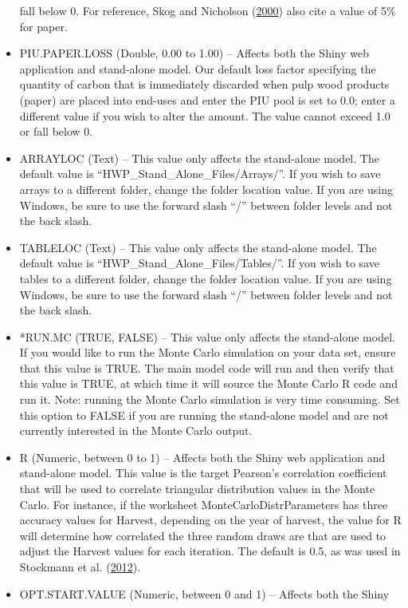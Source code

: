 \documentclass[
  openany]{book}
\begin{document}
\begin{itemize}
  fall below 0. For reference, Skog and Nicholson
  (\protect\hyperlink{ref-skog2000}{2000}) also cite a value of 5\% for
  paper.
\item
  PIU.PAPER.LOSS (Double, 0.00 to 1.00) -- Affects both the Shiny web
  application and stand-alone model. Our default loss factor specifying
  the quantity of carbon that is immediately discarded when pulp wood
  products (paper) are placed into end-uses and enter the PIU pool is
  set to 0.0; enter a different value if you wish to alter the amount.
  The value cannot exceed 1.0 or fall below 0.
\item
  ARRAYLOC (Text) -- This value only affects the stand-alone model. The
  default value is ``HWP\_Stand\_Alone\_Files/Arrays/''. If you wish to
  save arrays to a different folder, change the folder location value.
  If you are using Windows, be sure to use the forward slash ``/''
  between folder levels and not the back slash.
\item
  TABLELOC (Text) -- This value only affects the stand-alone model. The
  default value is ``HWP\_Stand\_Alone\_Files/Tables/''. If you wish to
  save tables to a different folder, change the folder location value.
  If you are using Windows, be sure to use the forward slash ``/''
  between folder levels and not the back slash.
\item
  *RUN.MC (TRUE, FALSE) -- This value only affects the stand-alone
  model. If you would like to run the Monte Carlo simulation on your
  data set, ensure that this value is TRUE. The main model code will run
  and then verify that this value is TRUE, at which time it will source
  the Monte Carlo R code and run it. Note: running the Monte Carlo
  simulation is very time consuming. Set this option to FALSE if you are
  running the stand-alone model and are not currently interested in the
  Monte Carlo output.
\item
  R (Numeric, between 0 to 1) -- Affects both the Shiny web application
  and stand-alone model. This value is the target Pearson's correlation
  coefficient that will be used to correlate triangular distribution
  values in the Monte Carlo. For instance, if the worksheet
  MonteCarloDistrParameters has three accuracy values for Harvest,
  depending on the year of harvest, the value for R will determine how
  correlated the three random draws are that are used to adjust the
  Harvest values for each iteration. The default is 0.5, as was used in
  Stockmann et al. (\protect\hyperlink{ref-stockmann2012}{2012}).
\item
  OPT.START.VALUE (Numeric, between 0 and 1) -- Affects both the Shiny

\end{itemize}
\end{document}
